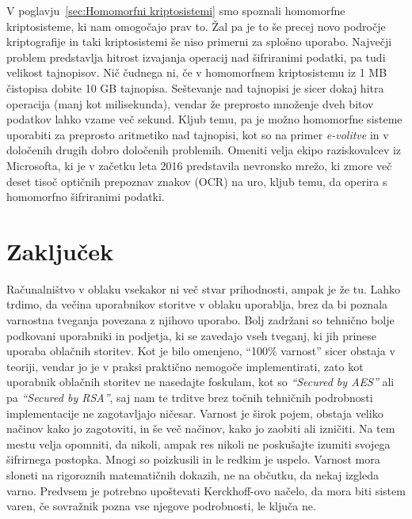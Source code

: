 \documentclass[12pt,a4paper,openany,tikz]{book}
\theoremstyle{plain}
\theoremstyle{definition}
\begin{document}
V poglavju~\ref{sec:Homomorfni kriptosistemi} smo spoznali homomorfne kriptosisteme, ki nam omogočajo prav to. Žal pa je to še precej novo področje kriptografije in taki kriptosistemi še niso primerni za splošno uporabo. Največji problem predstavlja hitrost izvajanja operacij nad šifriranimi podatki, pa tudi velikost tajnopisov. Nič čudnega ni, če v homomorfnem kriptosistemu iz 1 MB čistopisa dobite 10 GB tajnopisa. Seštevanje nad tajnopisi je sicer dokaj hitra operacija (manj kot milisekunda), vendar že preprosto množenje dveh bitov podatkov lahko vzame več sekund. Kljub temu, pa je možno homomorfne sisteme uporabiti za preprosto aritmetiko nad tajnopisi, kot so na primer \textit{e-volitve} in v določenih drugih dobro določenih problemih. Omeniti velja ekipo raziskovalcev iz Microsofta, ki je v začetku leta 2016 predstavila nevronsko mrežo, ki zmore več deset tisoč optičnih prepoznav znakov (OCR) na uro, kljub temu, da operira s homomorfno šifriranimi podatki.

\chapter{Zaključek}
\label{chap:Zakljucek}

Računalništvo v oblaku vsekakor ni več stvar prihodnosti, ampak je že tu. Lahko trdimo, da večina uporabnikov storitve v oblaku uporablja, brez da bi poznala varnostna tveganja povezana z njihovo uporabo. Bolj zadržani so tehnično bolje podkovani uporabniki in podjetja, ki se zavedajo vseh tveganj, ki jih prinese uporaba oblačnih storitev. Kot je bilo omenjeno, ``100\% varnost'' sicer obstaja v teoriji, vendar jo je v praksi praktično nemogoče implementirati, zato kot uporabnik oblačnih storitev ne nasedajte foskulam, kot so \textit{``Secured by AES''} ali pa \textit{``Secured by RSA''}, saj nam te trditve brez točnih tehničnih podrobnosti implementacije ne zagotavljajo ničesar. Varnost je širok pojem, obstaja veliko načinov kako jo zagotoviti, in še več načinov, kako jo zaobiti ali izničiti. Na tem mestu velja opomniti, da nikoli, ampak res nikoli ne poskušajte izumiti svojega šifrirnega postopka. Mnogi so poizkusili in le redkim je uspelo. Varnost mora sloneti na rigoroznih matematičnih dokazih, ne na občutku, da nekaj izgleda varno. Predvsem je potrebno upoštevati Kerckhoff-ovo načelo, da mora biti sistem varen, če sovražnik pozna vse njegove podrobnosti, le ključa ne.


\listoffigures

\clearpage

\listoftables




\clearpage
\nocite{*}

\label{literatura}

\end{document}
